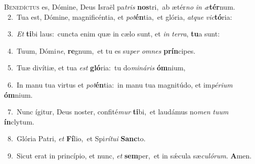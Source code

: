\lettrine{\initial\textcolor{\initialcolor}{B}}{enedíctus} es, Dómine, Deus Israël pa\textit{tris} \textbf{nos}\-tri,~\star ab ætér\textit{no} \textit{in} \textit{æ}\-\textbf{tér}num.\\
{\numbfont\textcolor{\numbcolor}{~2.}}~Tua est, Dómine, magnificéntia, et \textit{pot}\-\textbf{én}tia,~\star et glória, \textit{at}\-\textit{que} \textit{vic}\-\textbf{tó}ria:\par
{\numbfont\textcolor{\numbcolor}{~3.}}~\textit{Et} \textbf{ti}\-bi laus:~\star cuncta enim quæ in cælo sunt, et \textit{in} \textit{ter}\-\textit{ra}, \textbf{tu}\-a sunt:\par
{\numbfont\textcolor{\numbcolor}{~4.}}~Tuum, Dómi\-\textit{ne}\-, \textbf{re}\-gnum,~\star et tu es su\textit{per} \textit{om}\-\textit{nes} \textbf{prín}\-cipes.\par
{\numbfont\textcolor{\numbcolor}{~5.}}~Tuæ divítiæ, et tua \textit{est} \textbf{gló}\-ria:~\star tu do\-\textit{mi}\-\textit{ná}\textit{ris} \textbf{óm}\-nium,\par
{\numbfont\textcolor{\numbcolor}{~6.}}~In manu tua virtus et \textit{pot}\-\textbf{én}tia:~\star in manu tua magnitúdo, et im\-\textit{pé}\-\textit{ri}\textit{um} \textbf{óm}\-nium.\par
{\numbfont\textcolor{\numbcolor}{~7.}}~Nunc ígitur, Deus noster, confité\textit{mur} \textbf{ti}\-bi,~\star et laudámus no\textit{men} \textit{tu}\-\textit{um} \textbf{ín}\-clytum.\par
{\numbfont\textcolor{\numbcolor}{~8.}}~Glória Patri, \textit{et} \textbf{Fí}\-lio,~\star et Spi\-\textit{rí}\-\textit{tu}\textit{i} \textbf{Sanc}\-to.\par
{\numbfont\textcolor{\numbcolor}{~9.}}~Sicut erat in princípio, et nunc, \textit{et} \textbf{sem}\-per,~\star et in sǽcula sæ\-\textit{cu}\-\textit{ló}\textit{rum}. \textbf{A}\-men.\par
